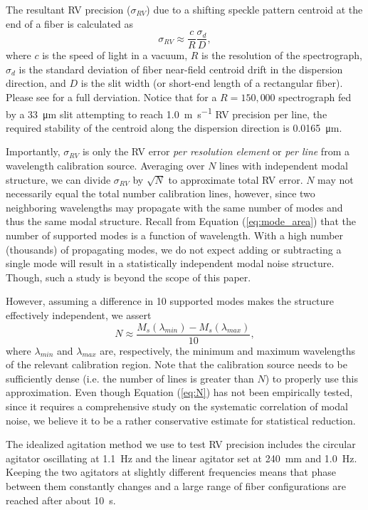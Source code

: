 \documentclass[11pt]{article}
\begin{document}
The resultant RV precision ($\sigma_{RV}$) due to a shifting speckle pattern centroid at the end of a fiber is calculated as
\begin{equation}
\sigma_{RV} \approx \frac{c}{R} \frac{\sigma_d}{D},
\label{eq:rv_error}
\end{equation}
where $c$ is the speed of light in a vacuum, $R$ is the resolution of the spectrograph, $\sigma_d$ is the standard deviation of fiber near-field centroid drift in the dispersion direction, and $D$ is the slit width (or short-end length of a rectangular fiber). Please see \citet{Petersburg2018} for a full derviation. Notice that for a $R=150,000$ spectrograph fed by a \SI{33}{\micro\meter} slit attempting to reach \SI{1.0}{\meter\per\second} RV precision per line, the required stability of the centroid along the dispersion direction is \SI{0.0165}{\micro\meter}.

Importantly, $\sigma_{RV}$ is only the RV error \textit{per resolution element} or \textit{per line} from a wavelength calibration source. Averaging over $N$ lines with independent modal structure, we can divide $\sigma_{RV}$ by $\sqrt{N}$ to approximate total RV error. $N$ may not necessarily equal the total number calibration lines, however, since two neighboring wavelengths may propagate with the same number of modes and thus the same modal structure. Recall from Equation (\ref{eq:mode_area}) that the number of supported modes is a function of wavelength. With a high number (thousands) of propagating modes, we do not expect adding or subtracting a single mode will result in a statistically independent modal noise structure. Though, such a study is beyond the scope of this paper.

However, assuming a difference in 10 supported modes makes the structure effectively independent, we assert
\begin{equation}
N \approx \frac{M_s(\lambda_{min}) - M_s(\lambda_{max})}{10},
\label{eq:N}
\end{equation}
where $\lambda_{min}$ and $\lambda_{max}$ are, respectively, the minimum and maximum wavelengths of the relevant calibration region. Note that the calibration source needs to be sufficiently dense (i.e. the number of lines is greater than $N$) to properly use this approximation. Even though Equation (\ref{eq:N}) has not been empirically tested, since it requires a comprehensive study on the systematic correlation of modal noise, we believe it to be a rather conservative estimate for statistical reduction.

The idealized agitation method we use to test RV precision includes the circular agitator oscillating at \SI{1.1}{\hertz} and the linear agitator set at \SI{240}{\milli\meter} and \SI{1.0}{\hertz}. Keeping the two agitators at slightly different frequencies means that phase between them constantly changes and a large range of fiber configurations are reached after about \SI{10}{\second}.
\end{document}
